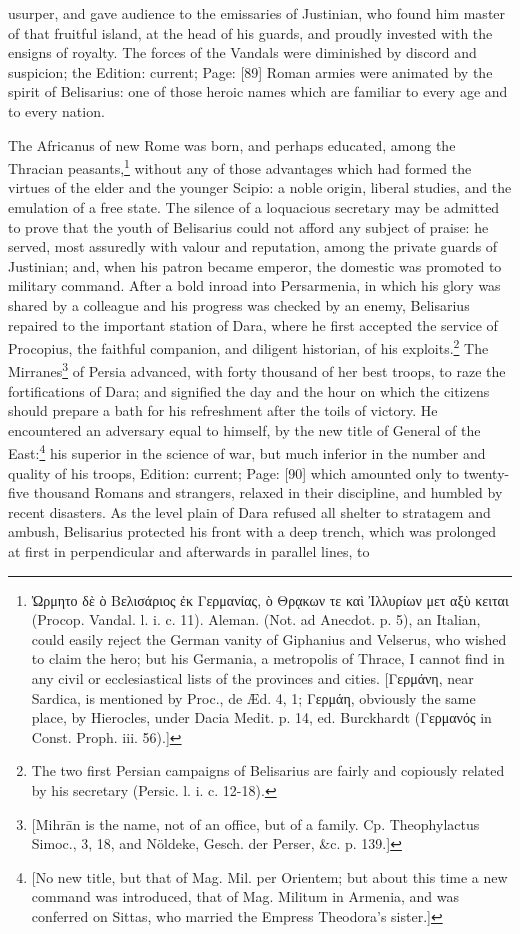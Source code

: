 usurper, and gave audience to the emissaries of Justinian, who found him master of that fruitful island, at the head of his guards, and proudly invested with the ensigns of royalty. The forces of the Vandals were diminished by discord and suspicion; the Edition: current; Page: [89] Roman armies were animated by the spirit of Belisarius: one of those heroic names which are familiar to every age and to every nation.

The Africanus of new Rome was born, and perhaps educated, among the Thracian peasants,\footnote{\textgreek{\texthebrew{Ὠ}ρμητο δ\texthebrew{ὲ ὸ} Βελισάριος \texthebrew{ἐ}κ Γερμανίας, \texthebrew{ὸ} Θρ\texthebrew{ᾳ}κων τε κα\texthebrew{ὶ Ἰ}λλυρίων μετ αξ\texthebrew{ὺ} κειται} (Procop. Vandal. l. i. c. 11). Aleman. (Not. ad Anecdot. p. 5), an Italian, could easily reject the German vanity of Giphanius and Velserus, who wished to claim the hero; but his Germania, a metropolis of Thrace, I cannot find in any civil or ecclesiastical lists of the provinces and cities. [\textgreek{Γερμάνη}, near Sardica, is mentioned by Proc., de Æd. 4, 1; \textgreek{Γερμάη}, obviously the same place, by Hierocles, under Dacia Medit. p. 14, ed. Burckhardt (\textgreek{Γερμανός} in Const. Proph. iii. 56).]} without any of those advantages which had formed the virtues of the elder and the younger Scipio: a noble origin, liberal studies, and the emulation of a free state. The silence of a loquacious secretary may be admitted to prove that the youth of Belisarius could not afford any subject of praise: he served, most assuredly with valour and reputation, among the private guards of Justinian; and, when his patron became emperor, the domestic was promoted to military command. After a bold inroad into Persarmenia, in which his glory was shared by a colleague and his progress was checked by an enemy, Belisarius repaired to the important station of Dara, where he first accepted the service of Procopius, the faithful companion, and diligent historian, of his exploits.\footnote{The two first Persian campaigns of Belisarius are fairly and copiously related by his secretary (Persic. l. i. c. 12-18).} The Mirranes\footnote{[Mihrān is the name, not of an office, but of a family. Cp. Theophylactus Simoc., 3, 18, and Nöldeke, Gesch. der Perser, \&c. p. 139.]} of Persia advanced, with forty thousand of her best troops, to raze the fortifications of Dara; and signified the day and the hour on which the citizens should prepare a bath for his refreshment after the toils of victory. He encountered an adversary equal to himself, by the new title of General of the East:\footnote{[No new title, but that of Mag. Mil. per Orientem; but about this time a new command was introduced, that of Mag. Militum in Armenia, and was conferred on Sittas, who married the Empress Theodora\texthebrew{}’s sister.]} his superior in the science of war, but much inferior in the number and quality of his troops, Edition: current; Page: [90] which amounted only to twenty-five thousand Romans and strangers, relaxed in their discipline, and humbled by recent disasters. As the level plain of Dara refused all shelter to stratagem and ambush, Belisarius protected his front with a deep trench, which was prolonged at first in perpendicular and afterwards in parallel lines, to 